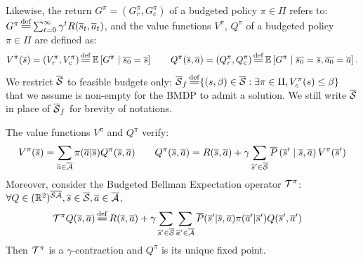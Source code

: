 \documentclass{article}
\begin{document}
Likewise, the return $G^\pi = (G_r^\pi, G_c^\pi)$ of a budgeted policy $\pi\in\Pi$ refers to:
$G^\pi \eqdef \sum_{t=0}^\infty \gamma^t R(\os_t, \oa_t)$,
and the value functions $V^\pi$, $Q^\pi$ of a budgeted policy $\pi\in\Pi$ are defined as:
\begin{equation}
    \label{eq:value-function}
V^\pi(\os) = (V_r^\pi, V_c^\pi) \eqdef \expectedvalue\left[ G^\pi \condbar \ov{s_0} = \os\right] \qquad Q^\pi(\os, \oa)= (Q_r^\pi, Q_c^\pi) \eqdef \expectedvalue\left[ G^\pi \condbar \ov{s_0} = \os, \ov{a_0} = \oa\right].
\end{equation}
We restrict $\overline{\mathcal{S}}$ to feasible budgets only: $\ocS_f \eqdef \{(s,\beta)\in\ocS: \exists \pi\in\Pi, V_c^\pi(s) \leq \beta\}$ that we assume is non-empty for the BMDP to admit a solution. We still write $\overline{\mathcal{S}}$ in place of $\overline{\mathcal{S}}_f$ for brevity of notations.

\begin{proposition}
\label{prop:bellman-expectation}
The value functions $V^\pi$ and $ Q^\pi$ verify:
\begin{align}
    V^\pi(\overline{s}) = \sum_{\overline{a}\in\overline{\mathcal{A}}}\pi(\overline{a} | \overline{s}) Q^\pi(\overline{s}, \overline{a}) \qquad Q^\pi(\overline{s}, \overline{a}) = R(\overline{s}, \overline{a}) + \gamma\sum_{\overline{s}'\in\overline{\mathcal{S}}}\overline{P}\left(\overline{s}' \;\middle|\; \overline{s}, \overline{a}\right) V^\pi(\overline{s}') \label{eq:bellman_expectation}
\end{align}
Moreover, consider the Budgeted Bellman Expectation operator $\mathcal{T}^\pi$:
$\forall Q\in(\mathbb{R}^2)^{\overline{\mathcal{S}}\overline{\mathcal{A}}}, \overline{s}\in\overline{\mathcal{S}}, \overline{a}\in\overline{\mathcal{A}}$,
\begin{align}
\label{eq:bellman_expectation_operator}
    \cT^\pi Q(\os, \oa) &\eqdef R(\os, \oa) + \gamma \sum_{\os'\in\ocS}\sum_{\oa'\in\ocA}\ov{P}(\os'|\os, \oa)\pi(\oa'|\os') Q(\os', \oa')
\end{align}
Then $\mathcal{T}^\pi$ is a $\gamma$-contraction and $Q^\pi$ is its unique fixed point.
\end{proposition}
\end{document}
